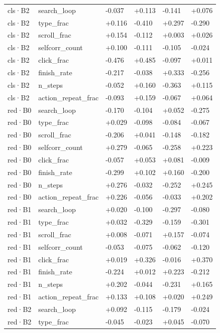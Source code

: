 \begin{table}[tp]
\begin{tabular}{@{}llllll@{}}
cls·B2 & search\_loop & -0.037 & +0.113 & -0.141 & +0.076 \\
cls·B2 & type\_frac & +0.116 & -0.410 & +0.297 & -0.290 \\
cls·B2 & scroll\_frac & +0.154 & -0.112 & +0.003 & +0.026 \\
cls·B2 & selfcorr\_count & +0.100 & -0.111 & -0.105 & -0.024 \\
cls·B2 & click\_frac & -0.476 & +0.485 & -0.097 & +0.011 \\
cls·B2 & finish\_rate & -0.217 & -0.038 & +0.333 & -0.256 \\
cls·B2 & n\_steps & -0.052 & +0.160 & -0.363 & +0.115 \\
cls·B2 & action\_repeat\_frac & -0.093 & +0.159 & -0.067 & +0.064 \\
red·B0 & search\_loop & -0.170 & -0.104 & +0.052 & -0.275 \\
red·B0 & type\_frac & +0.029 & -0.098 & -0.084 & -0.067 \\
red·B0 & scroll\_frac & -0.206 & +0.041 & -0.148 & -0.182 \\
red·B0 & selfcorr\_count & +0.279 & -0.065 & -0.258 & +0.223 \\
red·B0 & click\_frac & -0.057 & +0.053 & +0.081 & -0.009 \\
red·B0 & finish\_rate & -0.299 & +0.102 & +0.160 & -0.200 \\
red·B0 & n\_steps & +0.276 & -0.032 & -0.252 & +0.245 \\
red·B0 & action\_repeat\_frac & +0.226 & -0.056 & -0.033 & +0.202 \\
red·B1 & search\_loop & +0.020 & -0.100 & -0.297 & -0.080 \\
red·B1 & type\_frac & +0.032 & -0.329 & -0.159 & -0.301 \\
red·B1 & scroll\_frac & +0.008 & -0.071 & +0.157 & -0.074 \\
red·B1 & selfcorr\_count & -0.053 & -0.075 & -0.062 & -0.120 \\
red·B1 & click\_frac & +0.019 & +0.326 & -0.016 & +0.370 \\
red·B1 & finish\_rate & -0.224 & +0.012 & +0.223 & -0.212 \\
red·B1 & n\_steps & +0.202 & -0.044 & -0.231 & +0.165 \\
red·B1 & action\_repeat\_frac & +0.133 & +0.108 & +0.020 & +0.249 \\
red·B2 & search\_loop & +0.092 & -0.115 & -0.179 & -0.024 \\
red·B2 & type\_frac & -0.045 & -0.023 & +0.045 & -0.070 \\

\end{tabular}
\end{table}
